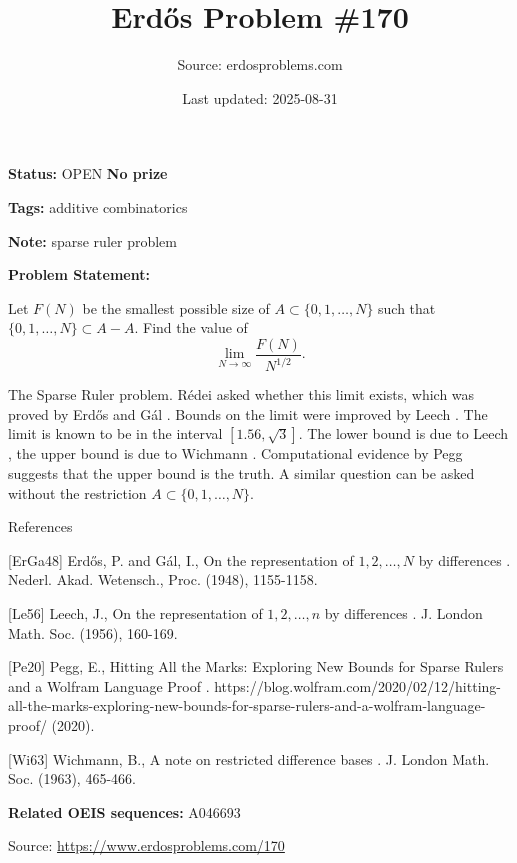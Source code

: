 \documentclass{article}
\title{Erd\H{o}s Problem \#170}
\date{Last updated: 2025-08-31}
\author{Source: erdosproblems.com}
\begin{document}
\maketitle

\noindent\textbf{Status:} OPEN \quad \textbf{No prize}

\noindent\textbf{Tags:} additive combinatorics

\medskip
\noindent\textbf{Note:} sparse ruler problem

\medskip

\noindent\textbf{Problem Statement:}

Let $F(N)$ be the smallest possible size of $A\subset \{0,1,\ldots,N\}$ such that $\{0,1,\ldots,N\}\subset A-A$. Find the value of\[\lim_{N\to \infty}\frac{F(N)}{N^{1/2}}.\]




The Sparse Ruler problem. R\'{e}dei asked whether this limit exists, which was proved by Erd\H{o}s and G\'{a}l \cite{ErGa48}. Bounds on the limit were improved by Leech \cite{Le56}. The limit is known to be in the interval $[1.56,\sqrt{3}]$. The lower bound is due to Leech \cite{Le56}, the upper bound is due to Wichmann \cite{Wi63}. Computational evidence by Pegg \cite{Pe20} suggests that the upper bound is the truth. A similar question can be asked without the restriction $A\subset \{0,1,\ldots,N\}$.




References

[ErGa48] Erd\H{o}s, P. and G\'{a}l, I., On the representation of $1,2,\ldots,N$ by differences . Nederl. Akad. Wetensch., Proc. (1948), 1155-1158.

[Le56] Leech, J., On the representation of $1,2,\ldots,n$ by differences . J. London Math. Soc. (1956), 160-169.

[Pe20] Pegg, E., Hitting All the Marks: Exploring New Bounds for Sparse Rulers and a Wolfram Language Proof . https://blog.wolfram.com/2020/02/12/hitting-all-the-marks-exploring-new-bounds-for-sparse-rulers-and-a-wolfram-language-proof/ (2020).

[Wi63] Wichmann, B., A note on restricted difference bases . J. London Math. Soc. (1963), 465-466.

\noindent\textbf{Related OEIS sequences:} A046693


\bigskip
\noindent\small{Source: \url{https://www.erdosproblems.com/170}}
\end{document}
